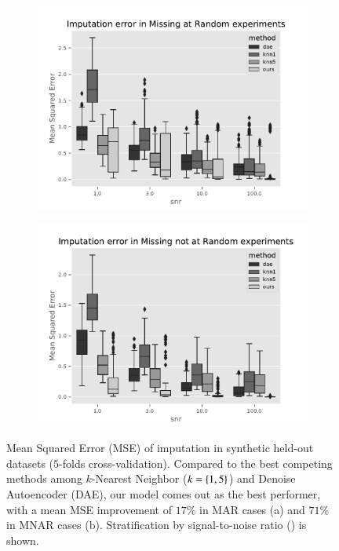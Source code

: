 \begin{figure}[htb]
\centering
\begin{subfigure}{.49\textwidth}
	\centering
        \includegraphics[width=\textwidth]{./tex/fig/mar_imput_err_boxplot.pdf}
        \caption{}
        \label{fig:synthetic_benchmark_mar_box}
\end{subfigure}%
\hfill
\begin{subfigure}{.49\textwidth}
	\centering
        \includegraphics[width=\textwidth]{./tex/fig/mnar_imput_err_boxplot.pdf}
	\caption{}
        \label{fig:synthetic_benchmark_mnar_box}
\end{subfigure}
\caption{
Mean Squared Error (MSE) of imputation in synthetic held-out datasets ($5$-folds cross-validation).
Compared to the best competing methods among $k$-Nearest Neighbor ($k=\left\{1, 5\right\}$) and Denoise Autoencoder (DAE), our model comes out as the best performer, with a mean MSE improvement of $17\%$ in MAR cases (a) and $71\%$ in MNAR cases (b).
Stratification by signal-to-noise ratio (\snr) is shown.
}
\label{fig:synthetic_benchmark_box}
\end{figure}

